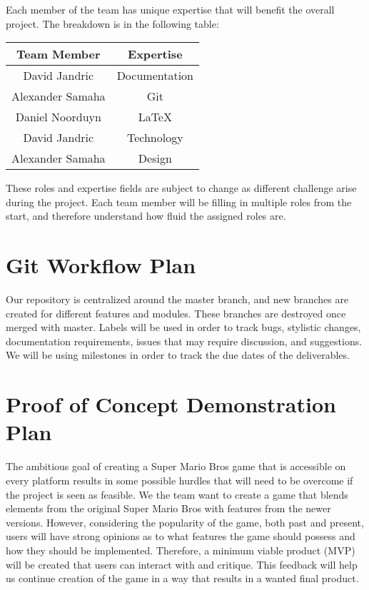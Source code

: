 \documentclass{article}
\begin{document}
Each member of the team has unique expertise that will benefit the overall
project. The breakdown is in the following table:

\begin{center}
  \begin{tabular}{ |c|c| }
    \hline
    Team Member & Expertise\\
    \hline
     David Jandric & Documentation\\
     Alexander Samaha & Git\\
     Daniel Noorduyn & LaTeX\\
     David Jandric & Technology\\
     Alexander Samaha & Design\\
    \hline
  \end{tabular}
\end{center}

These roles and expertise fields are subject to change as different challenge
arise during the project. Each team member will be filling in multiple roles
from the start, and therefore understand how fluid the assigned roles are.

\section{Git Workflow Plan}

Our repository is centralized around the master branch, and new branches are
created for different features and modules. These branches are destroyed once
merged with master. Labels will be used in order to track bugs, stylistic
changes, documentation requirements, issues that may require discussion, and
suggestions. We will be using milestones in order to track the due dates
of the deliverables.

\section{Proof of Concept Demonstration Plan}

The ambitious goal of creating a Super Mario Bros game that is accessible on
every platform results in some possible hurdles that will need to be overcome if
the project is seen as feasible. We the team want to create a game that blends
elements from the original Super Mario Bros with features from the newer
versions. However, considering the popularity of the game, both past and
present, users will have strong opinions as to what features the game should
possess and how they should be implemented. Therefore, a minimum viable product
(MVP) will be created that users can interact with and critique. This feedback
will help us continue creation of the game in a way that results in a wanted
final product.
\end{document}
